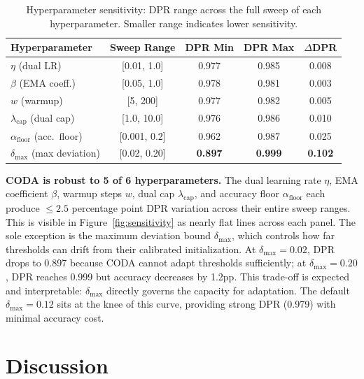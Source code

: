 \documentclass[10pt,twocolumn]{article}
\theoremstyle{definition}
\begin{document}
\begin{table}[t]
\centering
\caption{Hyperparameter sensitivity: DPR range across the full sweep of each hyperparameter. Smaller range indicates lower sensitivity.}
\label{tab:sensitivity}
\small
\begin{tabular}{@{}lcccc@{}}
\toprule
Hyperparameter & Sweep Range & DPR Min & DPR Max & $\Delta$DPR \\
\midrule
$\eta$ (dual LR) & [0.01, 1.0] & 0.977 & 0.985 & 0.008 \\
$\beta$ (EMA coeff.) & [0.05, 1.0] & 0.978 & 0.981 & 0.003 \\
$w$ (warmup) & [5, 200] & 0.977 & 0.982 & 0.005 \\
$\lambda_{\text{cap}}$ (dual cap) & [1.0, 10.0] & 0.976 & 0.986 & 0.010 \\
$\alpha_{\text{floor}}$ (acc.\ floor) & [0.001, 0.2] & 0.962 & 0.987 & 0.025 \\
\midrule
$\delta_{\max}$ (max deviation) & [0.02, 0.20] & \textbf{0.897} & \textbf{0.999} & \textbf{0.102} \\
\bottomrule
\end{tabular}
\end{table}

\textbf{CODA is robust to 5 of 6 hyperparameters.} The dual learning rate $\eta$, EMA coefficient $\beta$, warmup steps $w$, dual cap $\lambda_{\text{cap}}$, and accuracy floor $\alpha_{\text{floor}}$ each produce $\leq 2.5$ percentage point DPR variation across their entire sweep ranges. This is visible in Figure~\ref{fig:sensitivity} as nearly flat lines across each panel. The sole exception is the maximum deviation bound $\delta_{\max}$, which controls how far thresholds can drift from their calibrated initialization. At $\delta_{\max} = 0.02$, DPR drops to 0.897 because CODA cannot adapt thresholds sufficiently; at $\delta_{\max} = 0.20$, DPR reaches 0.999 but accuracy decreases by 1.2pp. This trade-off is expected and interpretable: $\delta_{\max}$ directly governs the capacity for adaptation. The default $\delta_{\max} = 0.12$ sits at the knee of this curve, providing strong DPR (0.979) with minimal accuracy cost.

\section{Discussion}
\label{sec:discussion}
\end{document}

